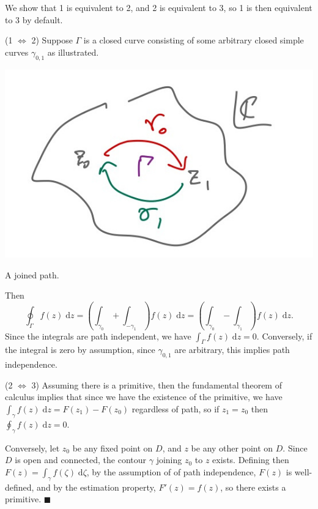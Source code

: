 \documentclass[letter-paper]{tufte-book}
\newenvironment{proof}[1][Proof]{\begin{trivlist}
\item[\hskip \labelsep {\bfseries #1}]}{\end{trivlist}}
\newcommand{\qed}{\hfill$\blacksquare$}
\begin{document}
\begin{proof}
  We show that 1 is equivalent to 2, and 2 is equivalent to 3, so 1 is then
  equivalent to 3 by default.
  
  (1 $\Leftrightarrow$ 2) Suppose $\Gamma$ is a closed curve consisting of some
  arbitrary closed simple curves $\gamma_{0,1}$ as illustrated.
  \begin{marginfigure}
    \includegraphics{comp_joined_curve}
    \caption{A joined path.}
  \end{marginfigure}
  
  Then
  \begin{equation*}
    \oint_\Gamma f(z)\; \mathrm{d}z = \left(\int_{\gamma_0} + \int_{-\gamma_1}\right) f(z)\; \mathrm{d}z = \left(\int_{\gamma_0} - \int_{\gamma_1}\right) f(z)\; \mathrm{d}z.
  \end{equation*}
  Since the integrals are path independent, we have $\int_{\Gamma} f(z)\;
  \mathrm{d}z = 0$. Conversely, if the integral is zero by assumption, since
  $\gamma_{0,1}$ are arbitrary, this implies path independence.
  
  (2 $\Leftrightarrow$ 3) Assuming there is a primitive, then the fundamental
  theorem of calculus implies that since we have the existence of the primitive,
  we have $\int_\gamma f(z)\; \mathrm{d}z = F(z_1) - F(z_0)$ regardless of path,
  so if $z_1 = z_0$ then $\oint_\gamma f(z)\; \mathrm{d}z = 0$.
  
  Conversely, let $z_0$ be any fixed point on $D$, and $z$ be any other point on
  $D$. Since $D$ is open and connected, the contour $\gamma$ joining $z_0$ to
  $z$ exists. Defining then $F(z) = \int_\gamma f(\zeta)\; \mathrm{d}\zeta$, by
  the assumption of of path independence, $F(z)$ is well-defined, and by the
  estimation property, $F'(z) = f(z)$, so there exists a primitive. \qed
\end{proof}
\end{document}
